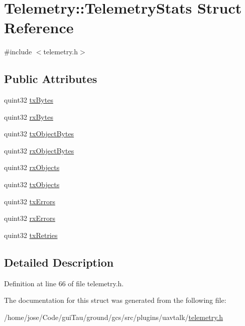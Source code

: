\hypertarget{struct_telemetry_1_1_telemetry_stats}{\section{Telemetry\-:\-:Telemetry\-Stats Struct Reference}
\label{struct_telemetry_1_1_telemetry_stats}
}


{\ttfamily \#include $<$telemetry.\-h$>$}

\subsection*{Public Attributes}
\begin{DoxyCompactItemize}
\item 
quint32 \hyperlink{group___u_a_v_talk_plugin_ga349d8c0f2aac815d79b13e54f818658c}{tx\-Bytes}
\item 
quint32 \hyperlink{group___u_a_v_talk_plugin_gadda927fbb6858f5e60b6daf16d5bc94e}{rx\-Bytes}
\item 
quint32 \hyperlink{group___u_a_v_talk_plugin_ga5c315107de95913671e9bd51ce699e1f}{tx\-Object\-Bytes}
\item 
quint32 \hyperlink{group___u_a_v_talk_plugin_ga495b5acf35424dbdf221e81f0024ae92}{rx\-Object\-Bytes}
\item 
quint32 \hyperlink{group___u_a_v_talk_plugin_gacd544f271fc6ee0f5eb72dc101a23c21}{rx\-Objects}
\item 
quint32 \hyperlink{group___u_a_v_talk_plugin_gaa7970a8185efea335e5cbe734739eca9}{tx\-Objects}
\item 
quint32 \hyperlink{group___u_a_v_talk_plugin_gad6930d8f0e5a3c2e251c9600d1264c1a}{tx\-Errors}
\item 
quint32 \hyperlink{group___u_a_v_talk_plugin_gaf07e5e11a7f3b4c277a26fa5dba7d3fa}{rx\-Errors}
\item 
quint32 \hyperlink{group___u_a_v_talk_plugin_ga071780b1d6a06aa36a41efaa190e97ec}{tx\-Retries}
\end{DoxyCompactItemize}


\subsection{Detailed Description}


Definition at line 66 of file telemetry.\-h.



The documentation for this struct was generated from the following file\-:\begin{DoxyCompactItemize}
\item 
/home/jose/\-Code/gui\-Tau/ground/gcs/src/plugins/uavtalk/\hyperlink{telemetry_8h}{telemetry.\-h}\end{DoxyCompactItemize}
